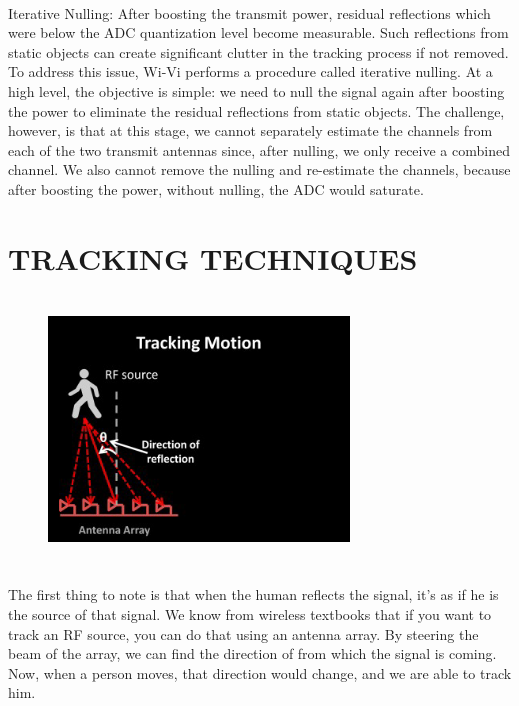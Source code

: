 \documentclass[a4paper,12pt,oneside]{article}
\begin{document}
\paragraph{}
Iterative Nulling: After boosting the transmit power, residual reflections which were below the
ADC quantization level become measurable. Such reflections from static objects can create
significant clutter in the tracking process if not removed. To address this issue, Wi-Vi performs a
procedure called iterative nulling. At a high level, the objective is simple: we need to null the
signal again after boosting the power to eliminate the residual reflections from static objects. The
challenge, however, is that at this stage, we cannot separately estimate the channels from each of
the two transmit antennas since, after nulling, we only receive a combined channel. We also
cannot remove the nulling and re-estimate the channels, because after boosting the power,
without nulling, the ADC would saturate.

\newpage
\section{TRACKING TECHNIQUES}

\begin{figure}[H]
\centering
\includegraphics[height=7cm,width=8cm]{10.png}
\end{figure}

\paragraph{}
The first thing to note is that when the human reflects the signal, it’s as if he is the source
of that signal. We know from wireless textbooks that if you want to track an RF source, you can
do that using an antenna array. By steering the beam of the array, we can find the direction of
from which the signal is coming. Now, when a person moves, that direction would change, and
we are able to track him.
\end{document}
